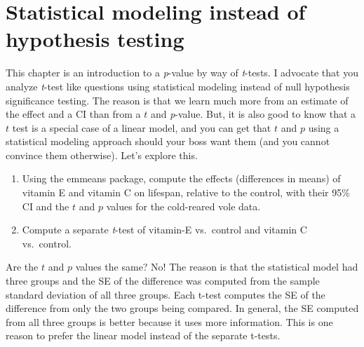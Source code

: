 \documentclass[]{book}
\providecommand{\tightlist}{%
  \setlength{\itemsep}{0pt}\setlength{\parskip}{0pt}}
\begin{document}
\hypertarget{statistical-modeling-instead-of-hypothesis-testing}{%
\section{Statistical modeling instead of hypothesis testing}\label{statistical-modeling-instead-of-hypothesis-testing}}

This chapter is an introduction to a \emph{p}-value by way of \emph{t}-tests. I advocate that you analyze \emph{t}-test like questions using statistical modeling instead of null hypothesis significance testing. The reason is that we learn much more from an estimate of the effect and a CI than from a \(t\) and \emph{p}-value. But, it is also good to know that a \(t\) test is a special case of a linear model, and you can get that \(t\) and \(p\) using a statistical modeling approach should your boss want them (and you cannot convince them otherwise). Let's explore this.

\begin{enumerate}
\def\labelenumi{\arabic{enumi}.}
\tightlist
\item
  Using the emmeans package, compute the effects (differences in means) of vitamin E and vitamin C on lifespan, relative to the control, with their 95\% CI and the \(t\) and \(p\) values for the cold-reared vole data.
\item
  Compute a separate \emph{t}-test of vitamin-E vs.~control and vitamin C vs.~control.
\end{enumerate}

Are the \(t\) and \(p\) values the same? No! The reason is that the statistical model had three groups and the SE of the difference was computed from the sample standard deviation of all three groups. Each t-test computes the SE of the difference from only the two groups being compared. In general, the SE computed from all three groups is better because it uses more information. This is one reason to prefer the linear model instead of the separate t-tests.
\end{document}
